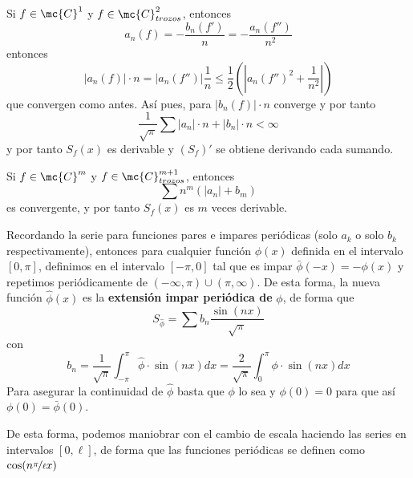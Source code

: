 \begin{dem}
        Si $f \in \mc{C}^1$ y $f \in \mc{C}^2_{trozos}$, entonces
        $$a_n(f)=-\dfrac{b_n(f')}{n}=-\dfrac{a_n(f'')}{n^2}$$
        entonces
        $$|a_n(f)| \cdot n = |a_n(f'')|\dfrac{1}{n}\leq \dfrac{1}{2} \left( |a_n(f'')^2+\dfrac{1}{n^2}| \right)$$
        que convergen como antes. Así pues, para $|b_n(f)| \cdot n$ converge y por tanto 
        $$\dfrac{1}{\sqrt{\pi}} \sum |a_n| \cdot n + |b_n|  \cdot n < \infty$$
        y por tanto $S_f(x)$ es derivable y $(S_f)'$ se obtiene derivando cada sumando. 
    \end{dem}
    \begin{cor}
        Si $f \in \mc{C}^m$ y $f \in \mc{C}^{m+1}_{trozos}$, entonces
        $$\sum n^m (|a_n|+b_m)$$
        es convergente, y por tanto $S_f(x)$ es $m$ veces derivable.
    \end{cor}
    \begin{obs}
        Recordando la serie para funciones pares e impares periódicas (solo $a_k$ o solo $b_k$ respectivamente), entonces para cualquier función $\phi(x)$ definida en el intervalo $[0,\pi]$, definimos en el intervalo $[-\pi,0]$ tal que es impar $\bar{\phi}(-x)=-\phi(x)$ y repetimos periódicamente de $(-\infty,\pi) \cup (\pi,\infty)$. De esta forma, la nueva función $\hat{\phi}(x)$ es la \textbf{extensión impar periódica de }$\phi$, de forma que 
        $$S_{\hat{\phi}}=\sum b_n \dfrac{\sin(nx)}{\sqrt{\pi}}$$
        con 
        $$b_n=\dfrac{1}{\sqrt{\pi}}\int_{-\pi}^{\pi} \hat{\phi} \cdot \sin(nx)dx = \dfrac{2}{\sqrt{\pi}}\int_0^{\pi} \phi \cdot \sin(nx) dx$$
        Para asegurar la continuidad de $\hat{\phi}$ basta que $\phi$ lo sea y \underline{$\phi(0)=0$} para que así $\phi(0)=\bar{\phi}(0)$. 

        De esta forma, podemos maniobrar con el cambio de escala haciendo las series en intervalos $[0,\ell]$, de forma que las funciones periódicas se definen como $\cos(n \nicefrac{\pi}{\ell} x)$
    \end{obs}
